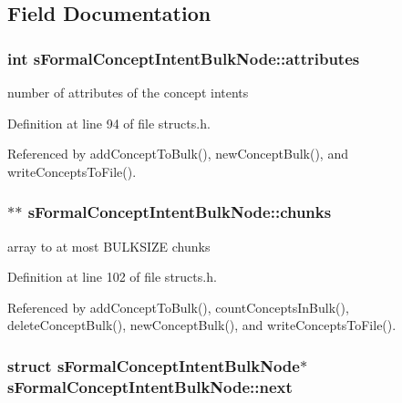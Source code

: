 \subsection{\-Field \-Documentation}
\hypertarget{structsFormalConceptIntentBulkNode_a1fbfa6da3820560fef8549991a83e694}{
\subsubsection[{attributes}]{\setlength{\rightskip}{0pt plus 5cm}int {\bf s\-Formal\-Concept\-Intent\-Bulk\-Node\-::attributes}}}\label{structsFormalConceptIntentBulkNode_a1fbfa6da3820560fef8549991a83e694}


number of attributes of the concept intents 



\-Definition at line 94 of file structs.\-h.



\-Referenced by add\-Concept\-To\-Bulk(), new\-Concept\-Bulk(), and write\-Concepts\-To\-File().

\hypertarget{structsFormalConceptIntentBulkNode_a581d8ff2f4deebf047730cfd5be1f754}{
\subsubsection[{chunks}]{$\ast$$\ast$ {\bf s\-Formal\-Concept\-Intent\-Bulk\-Node\-::chunks}}}\label{structsFormalConceptIntentBulkNode_a581d8ff2f4deebf047730cfd5be1f754}


array to at most \-B\-U\-L\-K\-S\-I\-Z\-E chunks 



\-Definition at line 102 of file structs.\-h.



\-Referenced by add\-Concept\-To\-Bulk(), count\-Concepts\-In\-Bulk(), delete\-Concept\-Bulk(), new\-Concept\-Bulk(), and write\-Concepts\-To\-File().

\hypertarget{structsFormalConceptIntentBulkNode_a1cff65c57653d96d207878be8614b383}{
\subsubsection[{next}]{\setlength{\rightskip}{0pt plus 5cm}struct {\bf s\-Formal\-Concept\-Intent\-Bulk\-Node}$\ast$ {\bf s\-Formal\-Concept\-Intent\-Bulk\-Node\-::next}}}\label{structsFormalConceptIntentBulkNode_a1cff65c57653d96d207878be8614b383}


